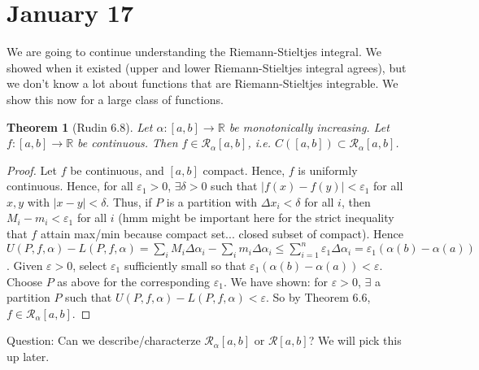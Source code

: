 \documentclass{article}
\theoremstyle{plain}
\newtheorem{theorem}{Theorem}
\theoremstyle{remark}
\newcommand{\R}{{\mathbb R}}
\newcommand{\ep}{{\varepsilon}}
\begin{document}
\section{January 17}
We are going to continue understanding the Riemann-Stieltjes integral.
We showed when it existed (upper and lower Riemann-Stieltjes integral agrees),
but we don't know a lot about functions that are Riemann-Stieltjes integrable.
We show this now for a large class of functions.
\begin{theorem}[Rudin 6.8]
	Let $\alpha \colon [a,b] \to \R$ be monotonically increasing.
	Let $f \colon [a,b] \to \R$ be continuous.
	Then $f \in \mathcal{R}_\alpha[a,b]$,
	i.e. $C([a,b]) \subset \mathcal{R}_\alpha[a,b]$.
\end{theorem}
\begin{proof}
	Let $f$ be continuous, and $[a,b]$ compact.
	Hence, $f$ is uniformly continuous.
	Hence, for all $\ep_1 > 0$, $\exists \delta > 0$ such that
	$|f(x) - f(y)| < \ep_1$ for all $x,y$ with $|x-y|<\delta$.
	Thus, if $P$ is a partition with $\Delta x_i < \delta$ for all $i$,
	then $M_i - m_i < \ep_1$ for all $i$
	(hmm might be important here for the strict inequality that $f$
	attain max/min because compact set... closed subset of compact).
	Hence $U(P,f,\alpha) - L(P,f,\alpha) =
	\sum_i M_i\Delta\alpha_i - \sum_i m_i \Delta\alpha_i
	\leq \sum_{i=1}^n \ep_1\Delta \alpha_i = \ep_1(\alpha(b) - \alpha(a))$.
	Given $\ep > 0$, select $\ep_1$ sufficiently small so that
	$\ep_1(\alpha(b) - \alpha(a)) < \ep$.
	Choose $P$ as above for the corresponding $\ep_1$.
	We have shown:
	for $\ep > 0$, $\exists$ a partition $P$ such that
	$U(P,f,\alpha) - L(P,f,\alpha) < \ep$.
	So by Theorem 6.6, $f \in \mathcal{R}_\alpha[a,b]$.
\end{proof}

Question: Can we describe/characterze $\mathcal{R}_\alpha[a,b]$ or $\mathcal{R}[a,b]$?
We will pick this up later.
\end{document}
